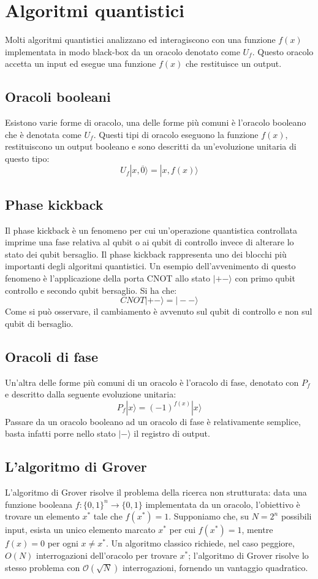 \section{Algoritmi quantistici \label{sec:algoritmi}}
Molti algoritmi quantistici analizzano ed interagiscono con una funzione $f(x)$ implementata in modo black-box da un oracolo denotato come $U_f$. Questo oracolo accetta un input ed esegue una funzione $f(x)$ che restituisce un output.
\subsection{Oracoli booleani}
Esistono varie forme di oracolo, una delle forme più comuni è l'oracolo booleano che è denotata come $U_f$. Questi tipi di oracolo eseguono la funzione $f(x)$, restituiscono un output booleano e sono descritti da un'evoluzione unitaria di questo tipo:
\begin{equation}
  U_f|x, \overline{0}\rangle = |x, f(x)\rangle
\end{equation}
\subsection{Phase kickback \label{sec:phase-kickback}}
Il phase kickback è un fenomeno per cui un'operazione quantistica controllata imprime una fase relativa al qubit o ai qubit di controllo invece di alterare lo stato dei qubit bersaglio. Il phase kickback rappresenta uno dei blocchi più importanti degli algoritmi quantistici. Un esempio dell'avvenimento di questo fenomeno è l'applicazione della porta CNOT allo stato $|+-\rangle$ con primo qubit controllo e secondo qubit bersaglio. Si ha che:
\begin{equation}
  CNOT|+-\rangle = |--\rangle
\end{equation}
Come si può osservare, il cambiamento è avvenuto sul qubit di controllo e non sul qubit di bersaglio.
\subsection{Oracoli di fase \label{sec:oracoli-fase}}
Un'altra delle forme più comuni di un oracolo è l'oracolo di fase, denotato con $P_f$ e descritto dalla seguente evoluzione unitaria:
\begin{equation}
  P_f|x\rangle = (-1)^{f(x)}|x\rangle
\end{equation}
Passare da un oracolo booleano ad un oracolo di fase è relativamente semplice, basta infatti porre nello stato $|-\rangle$ il registro di output.
\subsection{L'algoritmo di Grover}
L'algoritmo di Grover risolve il problema della ricerca non strutturata: data una funzione booleana $f : \{0, 1\}^n \to \{0, 1\}$ implementata da un oracolo, l'obiettivo è trovare un elemento $x^*$ tale che $f(x^*) = 1$. Supponiamo che, su $N = 2^n$ possibili input, esista un unico elemento marcato $x^*$ per cui $f(x^*) = 1$, mentre $f(x) = 0$ per ogni $x \neq x^*$. Un algoritmo classico richiede, nel caso peggiore, $O(N)$ interrogazioni dell'oracolo per trovare $x^*$; l'algoritmo di Grover risolve lo stesso problema con $\mathcal{O}(\sqrt{N})$ interrogazioni, fornendo un vantaggio quadratico.
